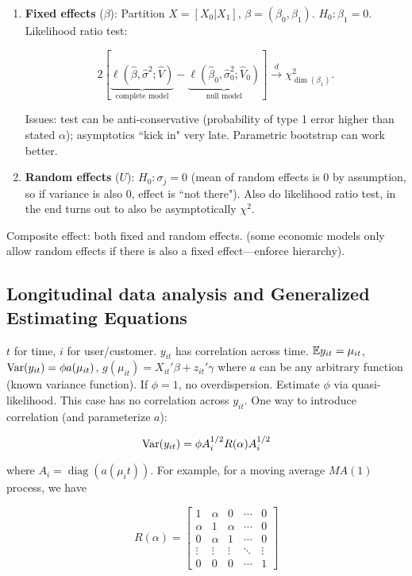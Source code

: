 \begin{enumerate}

\item \textbf{Fixed effects} (\(\beta\)): Partition \(X = [X_0 | X_1]\), \(\beta = (\beta_0, \beta_1)\). \(H_0: \beta_1 = 0\). Likelihood ratio test:

\[
2 \left[ \underbrace{ \ell(\hat{\beta}, \hat{\sigma}^2; \hat{V})}_{\text{complete model}}  -   \underbrace{\ell(\hat{\beta}_0, \hat{\sigma}_0^2; \hat{V}_0)}_{\text{null model}} \right] \xrightarrow{d} \chi_{\operatorname{dim}(\beta_1)}^2.
\]

Issues: test can be anti-conservative (probability of type 1 error higher than stated \(\alpha\)); asymptotics ``kick in" very late. Parametric bootstrap can work better.

\item \textbf{Random effects} (\(U\)): \(H_0: \sigma_j = 0\) (mean of random effects is 0 by assumption, so if variance is also 0, effect is ``not there"). Also do likelihood ratio test, in the end turns out to also be asymptotically \(\chi^2\). 

\end{enumerate}

Composite effect: both fixed and random effects. (some economic models only allow random effects if there is also a fixed effect---enforce hierarchy). 

\subsection{Longitudinal data analysis and Generalized Estimating Equations}

\(t\) for time, \(i\) for user/customer. \(y_{it}\) has correlation across time. \(\mathbb{E} y_{it} = \mu_{it}\), \(\mathrm{Var}(y_{it}) = \phi a(\mu_{it})\), \(g(\mu_{it} )= X_{it}' \beta + z_{it}' \gamma\) where \(a\) can be any arbitrary function (known variance function). If \(\phi=1\), no overdispersion. Estimate \(\phi\) via quasi-likelihood. This case has no correlation across \(y_{it}\). One way to introduce correlation (and parameterize \(a\)): 

\[
\mathrm{Var}(y_{it}) = \phi A_i^{1/2} R(\alpha) A_i^{1/2}
\]

where \(A_i = \operatorname{diag}(a(\mu_i t))\). For example, for a moving average \(MA(1)\) process, we have

\[
R(\alpha) = \begin{bmatrix}
1 & \alpha & 0 &  \cdots & 0 \\
\alpha & 1 & \alpha &  \cdots & 0 \\
0 & \alpha & 1 & \cdots & 0 \\
\vdots & \vdots & \vdots & \ddots & \vdots \\
0 & 0& 0& \cdots & 1 
\end{bmatrix}
\]

